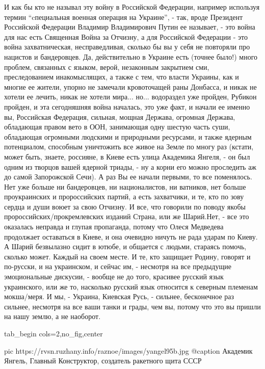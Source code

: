 И как бы кто не называл эту войну
в Российской Федерации, например используя термин \enquote{cпециальная военная
операция на Украине}, - так, вроде Президент Российской Федерации Владимир
Владимирович Путин ее называет, - это война для нас есть Священная Война за
Отчизну, а для Российской Федерации - это война захватническая, несправедливая,
сколько бы вы у себя не повторяли про нацистов и бандеровцев. Да, действительно
в Украине есть (точнее было!) много проблем, связанных с языком, верой,
незаконным закрытием сми, преследованием инакомыслящих, а также с тем, что
власти Украины, как и многие ее жители, упорно не замечали кровоточащей раны
Донбасса, и никак не хотели ее лечить, никак не хотели мира... но... водораздел
уже пройден, Рубикон пройден, и эта сегодняшняя война началась, это уже факт, и
начали ее именно вы, Российская Федерация, сильная, мощная Держава, огромная
Держава, обладающая правом вето в ООН, занимающая одну шестую часть суши,
обладающая огромными людскими и природными ресурсами, и также ядерным
потенциалом, способным уничтожить все живое на Земле по многу раз (кстати,
может быть, знаете, россияне, в Киеве есть улица Академика Янгеля, -  он был
одним из творцов вашей ядерной триады, - ну а корни его можно проследить аж до
самой Запорожской Сечи). А раз Вы ее начали первыми, то все поменялось.  Нет
уже больше ни бандеровцев, ни националистов, ни ватников, нет больше
проукраинских и пророссийских партий, а есть захватчики, и те, кто по зову
сердца и души воюет за свою Отчизну. И все, что говорили по поводу якобы
пророссийских/прокремлевских изданий Страна, или же Шарий.Нет, - все это
оказалась неправда и глупая пропаганда, потому что Олеся Медведева продолжает
оставаться в Киеве, и она очевидно ничуть не рада ударам по Киеву. А Шарий
безвылазно сидит в ютюбе, и общается с людьми, стараясь помочь, сколько может.
Каждый на своем месте. И те, кто защищает Родину, говорят и по-русски, и на
украинском, и сейчас им, - несмотря на все предыдущие эмоциональные дискусии, -
вообще не до того, красивее русский язык украинского, или же то, насколько
русский язык относится к северным племенам мокша/меря. И мы, - Украина,
Киевская Русь, - сильнее, бесконечное раз сильнее, несмотря на все ваши танки и
грады, чем вы, потому что это вы пришли на нашу землю, а не наоборот.

\ifcmt
  tab_begin cols=2,no_fig,center

     pic https://rvsn.ruzhany.info/raznoe/images/yangel95b.jpg
		 @caption Академик Янгель, Главный Конструктор, создатель ракетного щита СССР

